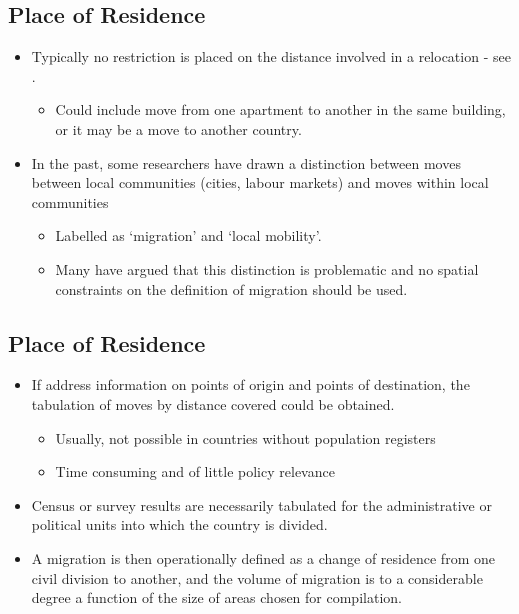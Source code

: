 \documentclass[
]{book}
\providecommand{\tightlist}{%
  \setlength{\itemsep}{0pt}\setlength{\parskip}{0pt}}
\begin{document}
\hypertarget{place-of-residence-1}{%
\subsection{Place of Residence}\label{place-of-residence-1}}

\begin{itemize}
\tightlist
\item
  Typically no restriction is placed on the distance involved in a relocation - see \citet{Lee1966}.

  \begin{itemize}
  \tightlist
  \item
    Could include move from one apartment to another in the same building, or it may be a move to another country.
  \end{itemize}
\item
  In the past, some researchers have drawn a distinction between moves between local communities (cities, labour markets) and moves within local communities

  \begin{itemize}
  \tightlist
  \item
    Labelled as `migration' and `local mobility'.
  \item
    Many have argued that this distinction is problematic and no spatial constraints on the definition of migration should be used.
  \end{itemize}
\end{itemize}

\hypertarget{place-of-residence-2}{%
\subsection{Place of Residence}\label{place-of-residence-2}}

\begin{itemize}
\tightlist
\item
  If address information on points of origin and points of destination, the tabulation of moves by distance covered could be obtained.

  \begin{itemize}
  \tightlist
  \item
    Usually, not possible in countries without population registers
  \item
    Time consuming and of little policy relevance
  \end{itemize}
\item
  Census or survey results are necessarily tabulated for the administrative or political units into which the country is divided.
\item
  A migration is then operationally defined as a change of residence from one civil division to another, and the volume of migration is to a considerable degree a function of the size of areas chosen for compilation.
\end{itemize}
\end{document}
